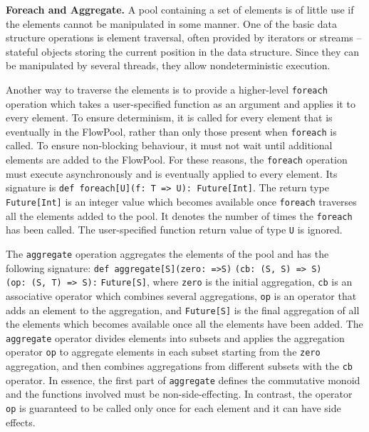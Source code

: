 \documentclass[runningheads,a4paper]{llncs}
\begin{document}

\textbf{Foreach and Aggregate.}
A pool containing a set of elements is of little use if the elements
cannot be manipulated in some manner.
One of the basic data structure operations is element traversal,
often provided by iterators or streams -- stateful
objects storing the current position in the data structure.
Since they can be manipulated by several threads, they allow
nondeterministic execution.

Another way to traverse the elements is to provide a higher-level
\verb=foreach= operation which takes a user-specified function as an
argument and
applies it to every element.
To ensure determinism, it is called for every element that is
eventually in the FlowPool, rather than only those present
when \verb=foreach= is called.
To ensure non-blocking behaviour, it must not wait until
additional elements are added to the FlowPool.
For these reasons, the \verb=foreach= operation must execute
asynchronously and is eventually applied to every element.
Its signature is \verb+def foreach[U](f: T => U): Future[Int]+.
The return type \verb=Future[Int]= is an integer value which becomes
available once \verb=foreach= traverses all the elements added to the
pool.
It denotes the number of times the \verb=foreach= has been called.
The user-specified function return value of type \verb=U= is ignored.

The \verb=aggregate= operation aggregates the elements of the pool
and has the following signature: \verb+def aggregate[S]+\verb+(zero: =>S)+
\verb+(cb: (S, S) => S)+\\
\verb+(op: (S, T) => S):+ \verb+Future[S]+,
where \verb=zero= is the initial aggregation, \verb=cb= is an
associative operator which combines several aggregations, \verb=op= is
an operator that adds an element to the aggregation, and
\verb=Future[S]= is the final aggregation of all the elements which
becomes available once all the elements have been added.
The \verb=aggregate= operator divides elements into subsets and applies the
aggregation operator \verb=op= to aggregate elements in each subset
starting from the \verb=zero= aggregation, and then combines
aggregations from different subsets with the \verb=cb= operator.
In essence, the first part of \verb=aggregate= defines the commutative
monoid and the functions involved must be non-side-effecting.
In contrast, the operator \verb=op= is guaranteed to be called only once for
each element and it can have side effects.
\end{document}
